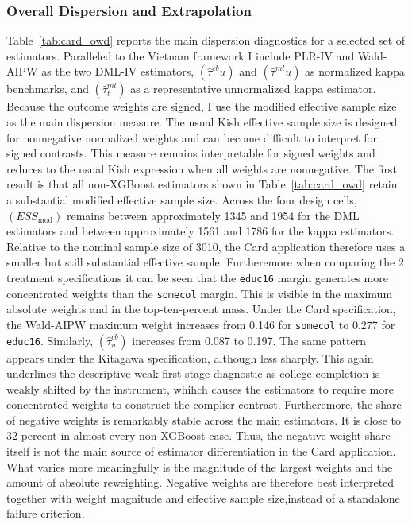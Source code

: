 \documentclass[12pt, a4paper, oneside]{article}
\theoremstyle{plain}
\theoremstyle{definition}
\begin{document}
\subsubsection{Overall Dispersion and Extrapolation}
Table~\ref{tab:card_owd} reports the main dispersion diagnostics for a selected set of estimators.
Paralleled to the Vietnam framework I include PLR-IV and Wald-AIPW as the two DML-IV estimators, $(\hat{\tau}^{cb}{u})$ and $(\hat{\tau}^{ml}{u})$ as normalized kappa benchmarks, and $(\hat{\tau}^{ml}_{t})$ as a representative unnormalized kappa estimator.
Because the outcome weights are signed, I use the modified effective sample size as the main dispersion measure. The usual Kish effective sample size is designed for nonnegative normalized weights and can become difficult to interpret for signed contrasts. 
This measure remains interpretable for signed weights and reduces to the usual Kish expression when all weights are nonnegative.
The first result is that all non-XGBoost estimators shown in Table~\ref{tab:card_owd} retain a substantial modified effective sample size. Across the four design cells, $(ESS_{\mathrm{mod}})$ remains between approximately 1345 and 1954 for the DML estimators and between approximately 1561 and 1786 for the kappa estimators.
Relative to the nominal sample size of 3010, the Card application therefore uses a smaller but still substantial effective sample.
Furtheremore when comparing the 2 treatment specifications it can be seen that the \texttt{educ16} margin generates more concentrated weights than the \texttt{somecol} margin. This is visible in the maximum absolute weights and in the top-ten-percent mass. Under the Card specification, the Wald-AIPW maximum weight increases from 0.146 for \texttt{somecol} to 0.277 for \texttt{educ16}. Similarly, $(\hat{\tau}^{cb}_{u})$ increases from 0.087 to 0.197. The same pattern appears under the Kitagawa specification, although less sharply. This again underlines the descriptive weak first stage diagnostic as college completion is weakly shifted by the instrument, whihch causes the estimators to require more concentrated weights to construct the complier contrast. 
Furtheremore, the share of negative weights is remarkably stable across the main estimators. It is close to 32 percent in almost every non-XGBoost case. Thus, the negative-weight share itself is not the main source of estimator differentiation in the Card application. What varies more meaningfully is the magnitude of the largest weights and the amount of absolute reweighting. Negative weights are therefore best interpreted together with weight magnitude and effective sample size,instead of a standalone failure criterion.
\end{document}
